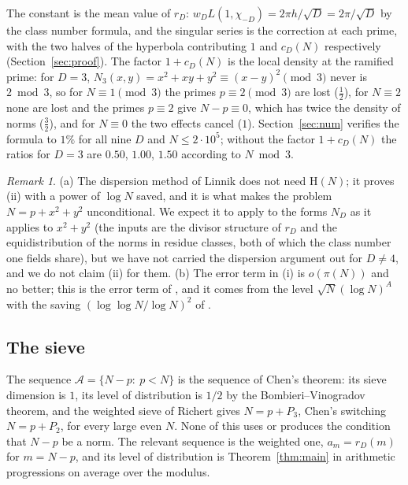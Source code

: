 \documentclass[11pt]{amsart}
\theoremstyle{definition}
\theoremstyle{remark}
\newtheorem{remark}[theorem]{Remark}
\begin{document}
The constant is the mean value of $r_D$: $w_DL(1,\chi_{-D})=2\pi h/\sqrt D=2\pi/\sqrt D$ by the class number formula, and the singular series is the correction at each prime, with the two halves of the hyperbola contributing $1$ and $c_D(N)$ respectively (Section~\ref{sec:proof}). The factor $1+c_D(N)$ is the local density at the ramified prime: for $D=3$, $N_3(x,y)=x^2+xy+y^2\equiv(x-y)^2\pmod3$ never is $2\bmod3$, so for $N\equiv1\pmod3$ the primes $p\equiv2\pmod3$ are lost ($\frac12$), for $N\equiv2$ none are lost and the primes $p\equiv2$ give $N-p\equiv0$, which has twice the density of norms ($\frac32$), and for $N\equiv0$ the two effects cancel ($1$). Section~\ref{sec:num} verifies the formula to $1\%$ for all nine $D$ and $N\le2\cdot10^5$; without the factor $1+c_D(N)$ the ratios for $D=3$ are $0.50$, $1.00$, $1.50$ according to $N\bmod3$.

\begin{remark}
(a) The dispersion method of Linnik does not need $\mathrm H(N)$; it proves (ii) with a power of $\log N$ saved, and it is what makes the problem $N=p+x^2+y^2$ unconditional. We expect it to apply to the forms $N_D$ as it applies to $x^2+y^2$ (the inputs are the divisor structure of $r_D$ and the equidistribution of the norms in residue classes, both of which the class number one fields share), but we have not carried the dispersion argument out for $D\ne4$, and we do not claim (ii) for them. (b) The error term in (i) is $o(\pi(N))$ and no better; this is the error term of \cite{FI18}, and it comes from the level $\sqrt N(\log N)^A$ with the saving $(\log\log N/\log N)^2$ of \cite{BFI89}.
\end{remark}

\subsection{The sieve}
The sequence $\mathcal A=\{N-p:\ p<N\}$ is the sequence of Chen's theorem: its sieve dimension is $1$, its level of distribution is $1/2$ by the Bombieri--Vinogradov theorem, and the weighted sieve of Richert gives $N=p+P_3$, Chen's switching $N=p+P_2$, for every large even $N$. None of this uses or produces the condition that $N-p$ be a norm. The relevant sequence is the weighted one, $a_m=r_D(m)$ for $m=N-p$, and its level of distribution is Theorem~\ref{thm:main} in arithmetic progressions on average over the modulus.
\end{document}
